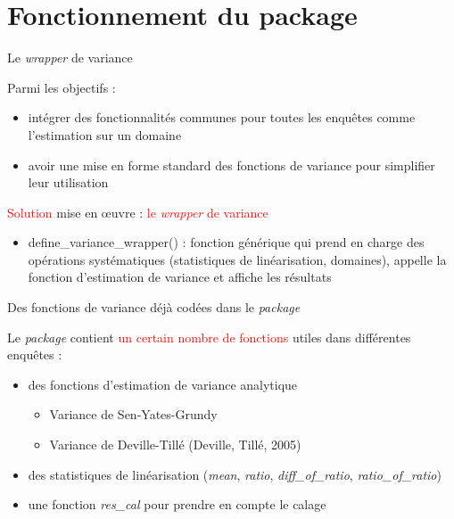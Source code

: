 \documentclass[xcolor=dvipsnames]{beamer}
\begin{document}
\section{Fonctionnement du package}

\begin{frame}{Le \textit{wrapper} de variance}

Parmi les objectifs :

\begin{itemize}
    \vspace{0.2 cm}
    \item intégrer des fonctionnalités communes pour toutes les enquêtes comme l'estimation sur un domaine
    \vspace{0.2 cm}
    \item avoir une mise en forme standard des fonctions de variance pour simplifier leur utilisation
\end{itemize}

\vspace{0.5 cm}
\textcolor{red}{Solution} mise en \oe uvre : \textcolor{red}{le \textit{wrapper} de variance}

\begin{itemize}
    \vspace{0.2 cm}
    \item define\_variance\_wrapper() : fonction générique qui prend en charge des opérations systématiques (statistiques de linéarisation, domaines), appelle la fonction d'estimation de variance et affiche les résultats
\end{itemize}
    
\end{frame}

\begin{frame}{Des fonctions de variance déjà codées dans le \textit{package}}
    
Le \textit{package} contient \textcolor{red}{un certain nombre de fonctions} utiles dans différentes enquêtes :
\vspace{0.2 cm}
\begin{itemize}
    \item des fonctions d'estimation de variance analytique
    \begin{itemize}
        \item Variance de Sen-Yates-Grundy
        \vspace{0.1 cm}
        \item Variance de Deville-Tillé (Deville, Tillé, 2005)
    \end{itemize}
    \vspace{0.2 cm}
    \item des statistiques de linéarisation (\textit{mean}, \textit{ratio}, \textit{diff\_of\_ratio},  \textit{ratio\_of\_ratio})
\vspace{0.2 cm}
    \item une fonction \textit{res\_cal} pour prendre en compte le calage
\end{itemize}

\end{frame}
\end{document}
